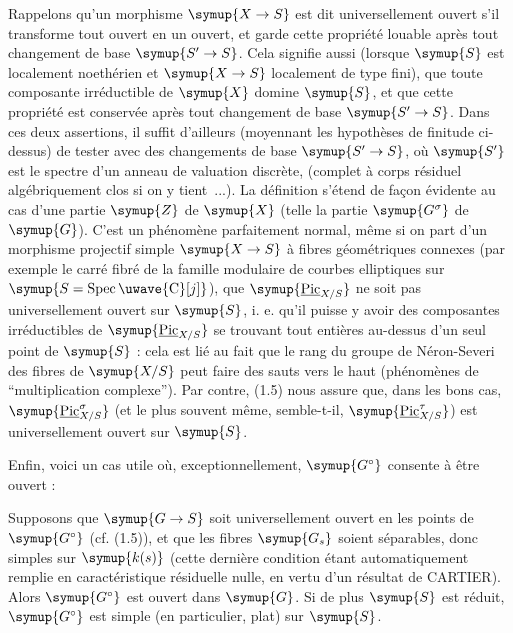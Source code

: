  Rappelons qu'un morphisme $\symup{X\to  S}$ est dit
universellement ouvert s'il transforme tout ouvert en un ouvert, et garde cette
propriété louable après tout changement de base $\symup{S'\to  S}$. Cela
signifie aussi (lorsque $\symup{S}$ est localement noethérien et $\symup{X\to  S}$
localement de type fini), que toute composante irréductible de $\symup{X}$ domine $\symup{S}$,
et que cette propriété est conservée après tout changement de base
$\symup{S'\to  S}$. Dans ces deux assertions, il suffit d'ailleurs
(moyennant les hypothèses de finitude ci-dessus) de tester avec des changements
de base $\symup{S'\to  S}$, où $\symup{S'}$ est le spectre d'un anneau de valuation
discrète, (complet à corps résiduel algébriquement clos si on y tient~...). La
définition s'étend de façon évidente au cas d'une partie $\symup{Z}$ de $\symup{X}$ (telle la
partie $\symup{G^\sigma}$ de $\symup{G}$). C'est un phénomène parfaitement normal, même si on
part d'un morphisme projectif simple $\symup{X\to  S}$ à fibres
géométriques connexes (par exemple le carré fibré de la famille modulaire de
courbes elliptiques sur $\symup{S=\operatorname{Spec}\text{\uwave{C}}[j]}$), que
$\symup{\underline{\operatorname{Pic}}_{X/S}}$ ne soit pas universellement ouvert sur $\symup{S}$, i. e.
qu'il puisse y avoir des composantes irréductibles de
$\symup{\underline{\operatorname{Pic}}_{X/S}}$ se trouvant tout entières au-dessus d'un seul point
de $\symup{S}$ : cela est lié au fait que le rang du groupe de Néron-Severi des fibres
de $\symup{X/S}$ peut faire des sauts vers le haut (phénomènes de ``multiplication complexe''). Par contre, (1.5) nous assure que, dans les bons cas,
$\symup{\underline{\operatorname{Pic}}_{X/S}^\sigma}$ (et le plus souvent même, semble-t-il,
$\symup{\underline{\operatorname{Pic}}_{X/S}^\tau}$) est universellement ouvert sur $\symup{S}$.

Enfin, voici un cas utile où, exceptionnellement, $\symup{G^\circ}$ consente à être
ouvert :

 Supposons que $\symup{G\to S}$ soit
universellement ouvert en les points de $\symup{G^\circ}$ (cf. (1.5)), et que les
fibres $\symup{G_s}$ soient séparables, donc simples sur $\symup{k(s)}$ (cette dernière
condition étant automatiquement remplie en caractéristique résiduelle nulle,
en vertu d'un résultat de CARTIER). Alors $\symup{G^\circ}$ est ouvert dans $\symup{G}$. Si de
plus $\symup{S}$ est réduit, $\symup{G^\circ}$ est simple (en particulier, plat) sur $\symup{S}$.

